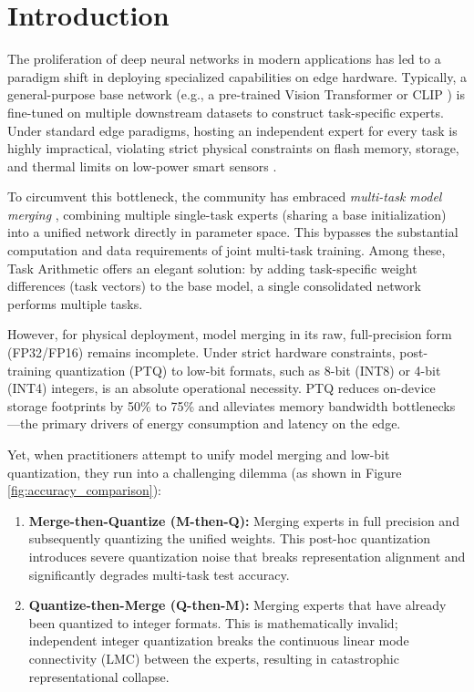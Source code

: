 \section{Introduction}
\label{sec:intro}

The proliferation of deep neural networks in modern applications has led to a paradigm shift in deploying specialized capabilities on edge hardware. Typically, a general-purpose base network (e.g., a pre-trained Vision Transformer \cite{vaswani2017attention} or CLIP \cite{radford2021learning}) is fine-tuned on multiple downstream datasets to construct task-specific experts. Under standard edge paradigms, hosting an independent expert for every task is highly impractical, violating strict physical constraints on flash memory, storage, and thermal limits on low-power smart sensors \cite{gholami2021survey, jacob2018quantization}.

To circumvent this bottleneck, the community has embraced \emph{multi-task model merging} \cite{ilharco2022editing, wortsman2022model, jin2023regmean}, combining multiple single-task experts (sharing a base initialization) into a unified network directly in parameter space. This bypasses the substantial computation and data requirements of joint multi-task training. Among these, Task Arithmetic \cite{ilharco2022editing} offers an elegant solution: by adding task-specific weight differences (task vectors) to the base model, a single consolidated network performs multiple tasks.

However, for physical deployment, model merging in its raw, full-precision form (FP32/FP16) remains incomplete. Under strict hardware constraints, post-training quantization (PTQ) to low-bit formats, such as 8-bit (INT8) or 4-bit (INT4) integers, is an absolute operational necessity. PTQ reduces on-device storage footprints by 50\% to 75\% and alleviates memory bandwidth bottlenecks—the primary drivers of energy consumption and latency on the edge.

Yet, when practitioners attempt to unify model merging and low-bit quantization, they run into a challenging dilemma (as shown in Figure \ref{fig:accuracy_comparison}):
\begin{enumerate}
    \item \textbf{Merge-then-Quantize (M-then-Q):} Merging experts in full precision and subsequently quantizing the unified weights. This post-hoc quantization introduces severe quantization noise that breaks representation alignment and significantly degrades multi-task test accuracy.
    \item \textbf{Quantize-then-Merge (Q-then-M):} Merging experts that have already been quantized to integer formats. This is mathematically invalid; independent integer quantization breaks the continuous linear mode connectivity (LMC) \cite{ainsworth2022git, entezari2021role} between the experts, resulting in catastrophic representational collapse.
\end{enumerate}

